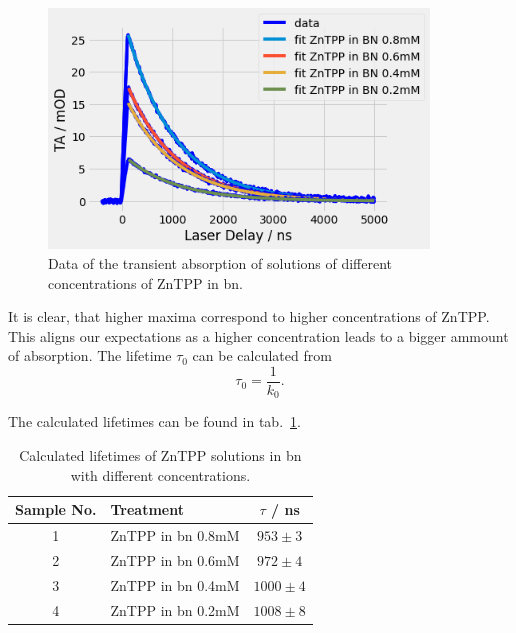 \begin{figure}[h]
    \centering
    \includegraphics[width = 0.9\textwidth]{Bilder/Auswertung/TRAS/ZnTPPdiffConc.png}
    \caption{Data of the transient absorption of solutions of different concentrations of ZnTPP in bn.}
    \label{fig:TRAS-Conc}
\end{figure}

It is clear, that higher maxima correspond to higher concentrations of ZnTPP. This aligns our expectations as a higher concentration leads to a bigger ammount of absorption. The lifetime $\tau_0$ can be calculated from 
\begin{equation}
    \tau_0 = \frac{1}{k_0}.
\end{equation}

The calculated lifetimes can be found in tab.~\ref{tab:lifetimesConc}.

\begin{table}[ht]
    \centering
    \begin{tabular}{clc}
        \toprule
        Sample No. &    Treatment &    $\tau$ / \si{\nano\second} \\
        \midrule
        1 &     ZnTPP in bn 0.8mM &  $953 \pm 3$ \\
        2 &     ZnTPP in bn 0.6mM &  $972 \pm 4$ \\
        3 &     ZnTPP in bn 0.4mM & $1000 \pm 4$ \\
        4 &     ZnTPP in bn 0.2mM & $1008 \pm 8$ \\
        \bottomrule
    \end{tabular}
    \caption{Calculated lifetimes of ZnTPP solutions in bn with different concentrations.}
    \label{tab:lifetimesConc}
\end{table}

